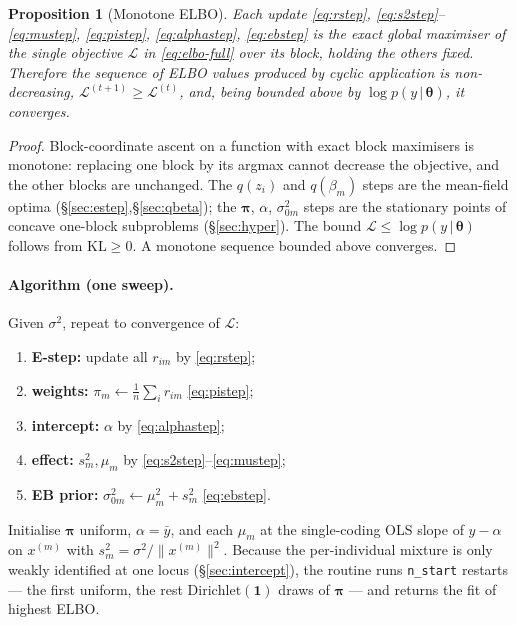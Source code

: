 \documentclass[11pt]{article}
\newcommand{\KL}{\mathrm{KL}}
\newcommand{\given}{\,\vert\,}
\newcommand{\sigsq}{\sigma^{2}}
\newcommand{\sigz}[1]{\sigma_{0#1}^{2}}
\theoremstyle{plain}
\newtheorem{proposition}{Proposition}
\theoremstyle{remark}
\begin{document}
\begin{proposition}[Monotone ELBO]
Each update \eqref{eq:rstep}, \eqref{eq:s2step}--\eqref{eq:mustep},
\eqref{eq:pistep}, \eqref{eq:alphastep}, \eqref{eq:ebstep} is the exact global
maximiser of the single objective $\mathcal L$ in \eqref{eq:elbo-full} over its
block, holding the others fixed. Therefore the sequence of ELBO values produced
by cyclic application is non-decreasing,
$\mathcal L^{(t+1)}\ge\mathcal L^{(t)}$, and, being bounded above by
$\log p(y\given\bm\theta)$, it converges.
\end{proposition}
\begin{proof}
Block-coordinate ascent on a function with exact block maximisers is monotone:
replacing one block by its argmax cannot decrease the objective, and the other
blocks are unchanged. The $q(z_i)$ and $q(\beta_m)$ steps are the mean-field
optima (\S\ref{sec:estep},\S\ref{sec:qbeta}); the $\bm\pi$, $\alpha$, $\sigz{m}$
steps are the stationary points of concave one-block subproblems
(\S\ref{sec:hyper}). The bound $\mathcal L\le\log p(y\given\bm\theta)$ follows
from $\KL\ge 0$. A monotone sequence bounded above converges.
\end{proof}

\paragraph{Algorithm (one sweep).} Given $\sigsq$, repeat to convergence of
$\mathcal L$:
\begin{enumerate}\itemsep2pt
  \item \textbf{E-step:} update all $r_{im}$ by \eqref{eq:rstep};
  \item \textbf{weights:} $\pi_m\leftarrow\frac1n\sum_i r_{im}$
        \eqref{eq:pistep};
  \item \textbf{intercept:} $\alpha$ by \eqref{eq:alphastep};
  \item \textbf{effect:} $s_m^2,\mu_m$ by \eqref{eq:s2step}--\eqref{eq:mustep};
  \item \textbf{EB prior:} $\sigz{m}\leftarrow\mu_m^2+s_m^2$ \eqref{eq:ebstep}.
\end{enumerate}
Initialise $\bm\pi$ uniform, $\alpha=\bar y$, and each $\mu_m$ at the single-coding
OLS slope of $y-\alpha$ on $x^{(m)}$ with $s_m^2=\sigsq/\|x^{(m)}\|^2$. Because
the per-individual mixture is only weakly identified at one locus
(\S\ref{sec:intercept}), the routine runs \texttt{n\_start} restarts --- the
first uniform, the rest $\mathrm{Dirichlet}(\mathbf 1)$ draws of $\bm\pi$ --- and
returns the fit of highest ELBO.
\end{document}

